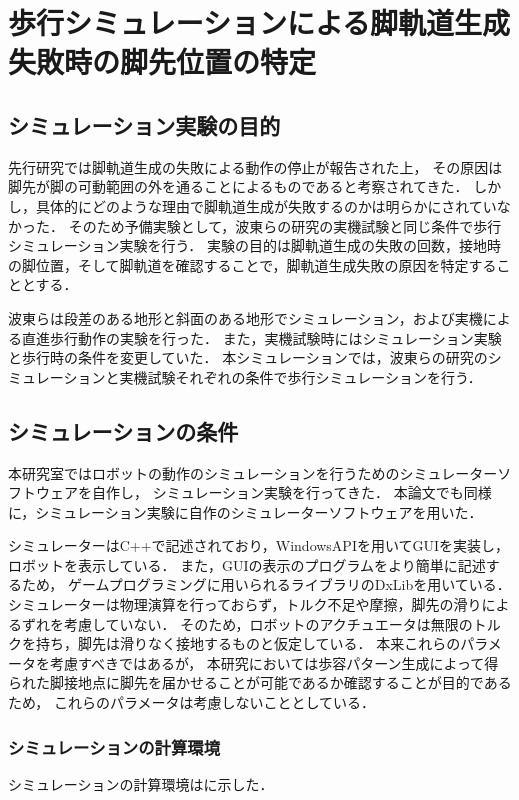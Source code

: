 \section{歩行シミュレーションによる脚軌道生成失敗時の脚先位置の特定}

\subsection{シミュレーション実験の目的}
先行研究では脚軌道生成の失敗による動作の停止が報告された上，
その原因は脚先が脚の可動範囲の外を通ることによるものであると考察されてきた．
しかし，具体的にどのような理由で脚軌道生成が失敗するのかは明らかにされていなかった．
そのため予備実験として，波東らの研究\cite{Hato_Graph_search}の実機試験と同じ条件で歩行シミュレーション実験を行う．
実験の目的は脚軌道生成の失敗の回数，接地時の脚位置，そして脚軌道を確認することで，脚軌道生成失敗の原因を特定することとする．

波東らは段差のある地形と斜面のある地形でシミュレーション，および実機による直進歩行動作の実験を行った．
また，実機試験時にはシミュレーション実験と歩行時の条件を変更していた．
本シミュレーションでは，波東らの研究のシミュレーションと実機試験それぞれの条件で歩行シミュレーションを行う．

\subsection{シミュレーションの条件}
本研究室ではロボットの動作のシミュレーションを行うためのシミュレーターソフトウェアを自作し，
シミュレーション実験を行ってきた．
本論文でも同様に，シミュレーション実験に自作のシミュレーターソフトウェアを用いた．

シミュレーターはC++で記述されており，WindowsAPIを用いてGUIを実装し，ロボットを表示している．
また，GUIの表示のプログラムをより簡単に記述するため，
ゲームプログラミングに用いられるライブラリのDxLib\cite{Dxlib_Web}を用いている．
シミュレーターは物理演算を行っておらず，トルク不足や摩擦，脚先の滑りによるずれを考慮していない．
そのため，ロボットのアクチュエータは無限のトルクを持ち，脚先は滑りなく接地するものと仮定している．
本来これらのパラメータを考慮すべきではあるが，
本研究においては歩容パターン生成によって得られた脚接地点に脚先を届かせることが可能であるか確認することが目的であるため，
これらのパラメータは考慮しないこととしている．

\subsubsection{シミュレーションの計算環境}
シミュレーションの計算環境はに示した．

